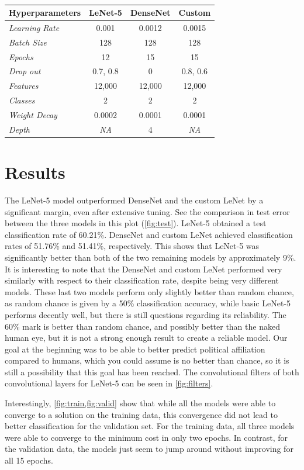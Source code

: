 \documentclass[manuscript,screen,review]{acmart}
\begin{document}
\begin{table}[h!]
\caption{}
  \label{tab:params}
  \begin{tabular}{lccc}
    \textbf{Hyperparameters} & LeNet-5 & DenseNet & Custom \\
    \toprule
    \textit{Learning Rate} & 0.001 & 0.0012 & 0.0015  \\
    \textit{Batch Size} & 128 & 128 & 128\\
    \textit{Epochs} & 12 & 15 & 15 \\
    \textit{Drop out} & 0.7, 0.8 & 0 & 0.8, 0.6 \\
    \textit{Features} & 12,000 & 12,000 & 12,000 \\
    \textit{Classes} & 2 & 2 & 2  \\
    \textit{Weight Decay} & 0.0002 & 0.0001 &  0.0001 \\
    \textit{Depth} & \textit{NA} & 4 & \textit{NA} \\
    \bottomrule
\end{tabular}
\end{table}

\section{Results}

The LeNet-5 model outperformed DenseNet and the custom LeNet by a significant margin, even after extensive tuning. See the comparison in test error between the three models in this plot (\cref{fig:test}). LeNet-5 obtained a test classification rate of 60.21\%. DenseNet and custom LeNet achieved classification rates of 51.76\% and 51.41\%, respectively. This shows that LeNet-5 was significantly better than both of the two remaining models by approximately 9\%. It is interesting to note that the DenseNet and custom LeNet performed very similarly with respect to their classification rate, despite being very different models. These last two models perform only slightly better than random chance, as random chance is given by a 50\% classification accuracy, while basic LeNet-5 performs decently well, but there is still questions regarding its reliability. The 60\% mark is better than random chance, and possibly better than the naked human eye, but it is not a strong enough result to create a reliable model. Our goal at the beginning was to be able to better predict political affiliation compared to humans, which you could assume is no better than chance, so it is still a possibility that this goal has been reached. The convolutional filters of both convolutional layers for LeNet-5 can be seen in \cref{fig:filters}.
\par
Interestingly, \cref{fig:train,fig:valid} show that while all the models were able to converge to a solution on the training data, this convergence did not lead to better classification for the validation set. For the training data, all three models were able to converge to the minimum cost in only two epochs. In contrast, for the validation data, the models just seem to jump around without improving for all 15 epochs. 
\end{document}
